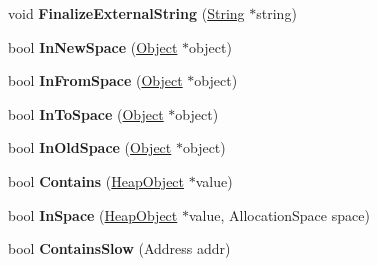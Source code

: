 \begin{DoxyCompactItemize}
\item 
void {\bfseries Finalize\+External\+String} (\hyperlink{classv8_1_1internal_1_1_string}{String} $\ast$string)\hypertarget{classv8_1_1internal_1_1_heap_a5bf15011d272b2585b175fdab5e980fe}{}\label{classv8_1_1internal_1_1_heap_a5bf15011d272b2585b175fdab5e980fe}

\item 
bool {\bfseries In\+New\+Space} (\hyperlink{classv8_1_1internal_1_1_object}{Object} $\ast$object)\hypertarget{classv8_1_1internal_1_1_heap_a5df71fbdc66bbad55e982a8949493b40}{}\label{classv8_1_1internal_1_1_heap_a5df71fbdc66bbad55e982a8949493b40}

\item 
bool {\bfseries In\+From\+Space} (\hyperlink{classv8_1_1internal_1_1_object}{Object} $\ast$object)\hypertarget{classv8_1_1internal_1_1_heap_a9f817ee001688038f88a45fa679b1b0a}{}\label{classv8_1_1internal_1_1_heap_a9f817ee001688038f88a45fa679b1b0a}

\item 
bool {\bfseries In\+To\+Space} (\hyperlink{classv8_1_1internal_1_1_object}{Object} $\ast$object)\hypertarget{classv8_1_1internal_1_1_heap_ae7f2e59a03a9b8435a7e3eb830d2880b}{}\label{classv8_1_1internal_1_1_heap_ae7f2e59a03a9b8435a7e3eb830d2880b}

\item 
bool {\bfseries In\+Old\+Space} (\hyperlink{classv8_1_1internal_1_1_object}{Object} $\ast$object)\hypertarget{classv8_1_1internal_1_1_heap_a74c78347ac78907c0b58651262449bea}{}\label{classv8_1_1internal_1_1_heap_a74c78347ac78907c0b58651262449bea}

\item 
bool {\bfseries Contains} (\hyperlink{classv8_1_1internal_1_1_heap_object}{Heap\+Object} $\ast$value)\hypertarget{classv8_1_1internal_1_1_heap_a1b48dc60c5fa004f9d99d7baaa52e11f}{}\label{classv8_1_1internal_1_1_heap_a1b48dc60c5fa004f9d99d7baaa52e11f}

\item 
bool {\bfseries In\+Space} (\hyperlink{classv8_1_1internal_1_1_heap_object}{Heap\+Object} $\ast$value, Allocation\+Space space)\hypertarget{classv8_1_1internal_1_1_heap_a01456cdc9f04c0ba881581c88074e8ba}{}\label{classv8_1_1internal_1_1_heap_a01456cdc9f04c0ba881581c88074e8ba}

\item 
bool {\bfseries Contains\+Slow} (Address addr)\hypertarget{classv8_1_1internal_1_1_heap_a8a441e3c3ee39cd7f06d165424263c27}{}\label{classv8_1_1internal_1_1_heap_a8a441e3c3ee39cd7f06d165424263c27}


\end{DoxyCompactItemize}

